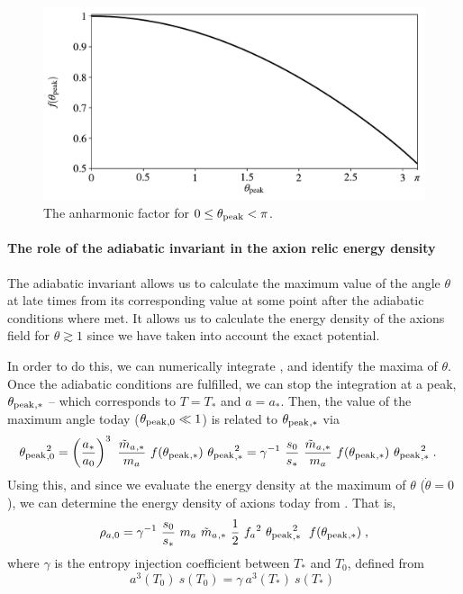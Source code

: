 \documentclass[11pt,a4paper]{article}
\begin{document}
\begin{figure}[t]
	\includegraphics[width=1\textwidth]{figs/anharmonic_factor.pdf}
	\caption{The anharmonic factor for $0 \leq \theta_{\rm peak}{} < \pi $.}
	\label{fig:anharmonic_factor}
\end{figure}



\paragraph{The role of the adiabatic invariant in the axion relic energy density}
%
The adiabatic invariant allows us to calculate the maximum value of the angle $\theta$ at late times from its corresponding value at some point after the adiabatic conditions where met. It allows us to calculate the energy density of the axions field for $\theta \gtrsim 1$ since we have taken into account the exact potential.

In order to do this, we can numerically integrate , and identify the maxima of $\theta$. Once the adiabatic conditions are fulfilled, we can stop the integration at a peak, $\theta_{\rm peak}{}_{,*}$ -- which corresponds to $T=T_{*}$ and $a=a_{*}$. Then, the value of the maximum angle today ($\theta_{\rm peak}{}_{,0} \ll 1$) is related to $\theta_{\rm peak}{}_{,*}$ via
%
\begin{eqnarray}
	\thetamax_{,0}^2 &=  \lrb{\dfrac{a_*}{a_0}}^3 \ \dfrac{\maT_{,*}}{\ma} \ f(\thetamax_{,*}) \ \thetamax_{,*}^2  =
	\gamma^{-1} \ \dfrac{s_0}{s_*} \ \dfrac{\maT_{,*}}{\ma} \ f(\thetamax_{,*}) \ \thetamax_{,*}^2 
	\; .
	\label{eq:theta_relation}
\end{eqnarray}
%
Using this, and since we evaluate the energy density at the maximum of $\theta$ (\ie $\dot \theta = 0$), we can determine the energy density of axions today from . That is,
%
\begin{equation}
	\rho_{a,0} = \gamma^{-1} \ \dfrac{s_0}{s_*} \ \ma \ \maT_{,*} \ \dfrac{1}{2} \ \fa^2 \ \thetamax_{,*}^2 \;  \ f(\thetamax_{,*}) \;,
	\label{eq:rho_axion_exact}
\end{equation}
%
where $\gamma$ is the entropy injection coefficient between $T_{*}$ and $T_0$, defined from 
%
\begin{equation}
	a^3(T_0) \ s(T_0) = \gamma \ a^3(T_*) \ s(T_*) \;
	\label{eq:entropy_injection_gamma}
\end{equation}
\end{document}
